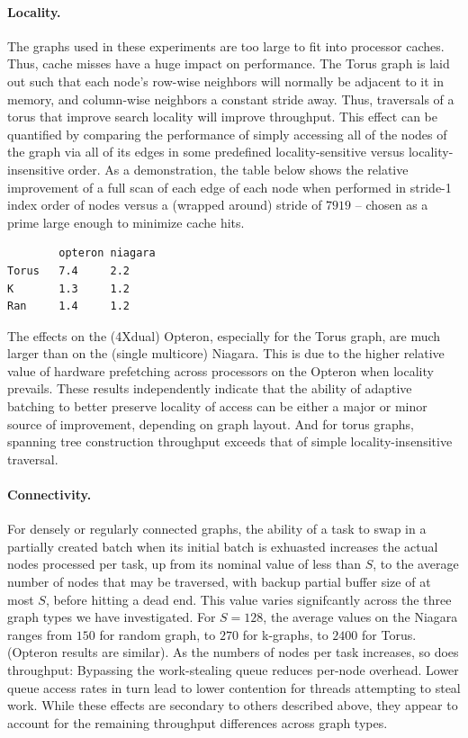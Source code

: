 \paragraph{Locality.} The graphs used in these experiments are too large to fit
into processor caches. Thus, cache misses have a huge impact on
performance. The Torus graph is laid out such that each node's
row-wise neighbors will normally be adjacent to it in memory, and
column-wise neighbors a constant stride away. Thus, traversals of a
torus that improve search locality will improve throughput.  This
effect can be quantified by comparing the performance of simply
accessing all of the nodes of the graph via all of its edges in some
predefined locality-sensitive versus locality-insensitive order.  As a
demonstration, the table below shows the relative
improvement of a full scan of each edge of each node when performed in
stride-1 index order of nodes versus a (wrapped around) stride of
$7919$ -- chosen as a prime large enough to minimize cache hits.  

{\footnotesize
\begin{verbatim}
        opteron niagara
Torus   7.4     2.2
K       1.3     1.2
Ran     1.4     1.2
\end{verbatim}}

The
effects on the (4Xdual) Opteron, especially for the Torus graph, are
much larger than on the (single multicore) Niagara. This is due to the
higher relative value of hardware prefetching across processors on the
Opteron when locality prevails.  These results independently indicate
that the ability of adaptive batching to better preserve locality of
access can be either a major or minor source of improvement, depending
on graph layout.  And for torus graphs, spanning tree construction
throughput exceeds that of simple locality-insensitive traversal.

\paragraph{Connectivity.}  For densely or regularly connected graphs, the
ability of a task to swap in a partially created batch when its
initial batch is exhuasted increases the actual nodes processed per
task, up from its nominal value of less than $S$, to the average number
of nodes that may be traversed, with backup partial buffer size of at
most $S$, before hitting a dead end. This value varies signifcantly
across the three graph types we have investigated. For $S=128$, the
average values on the Niagara ranges from $150$ for random graph, to $270$
for k-graphs, to $2400$ for Torus. (Opteron results are similar). As the
numbers of nodes per task increases, so does throughput: Bypassing the
work-stealing queue reduces per-node overhead.  Lower queue access
rates in turn lead to lower contention for threads attempting to steal
work. While these effects are secondary to others described above,
they appear to account for the remaining throughput differences across
graph types.

